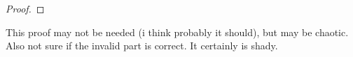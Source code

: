 \begin{proof}
\end{proof}

{\color{red} This proof may not be needed (i think probably it should), but may
be chaotic. Also not sure if the invalid part is correct. It certainly is
shady.}

